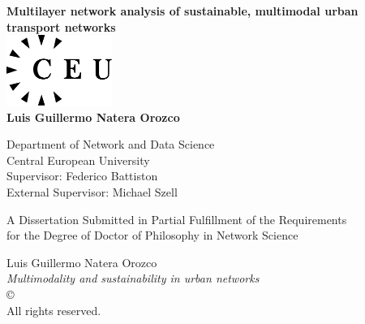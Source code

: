 \documentclass[a4paper,twoside,12pt]{book}
\begin{document}
\begin{titlepage}
	\begin{center}

		\textbf{\LARGE{Multilayer network analysis of sustainable, multimodal urban transport networks}}\\[3.3cm] %

		\includegraphics[width=3.45cm,height=2.3cm]{images/ceulogo.eps}\\[3.4cm]
		{\Large{\textbf{Luis Guillermo Natera Orozco}}}\\[0.4cm]

		\medskip

		Department of Network and Data Science \\
		Central European University\\ [1.2cm]

		Supervisor: Federico Battiston \\
		External Supervisor: Michael Szell

		\vfill

		A Dissertation Submitted in Partial Fulfillment of the Requirements\\ for the Degree of Doctor of Philosophy in Network Science\\[2cm]


		\vspace{1.0cm}
		\the\year
	\end{center}
\end{titlepage}

\newpage

\pagestyle{empty}

\mbox{}

\vfill

\noindent Luis Guillermo Natera Orozco\\
\emph{Multimodality and sustainability in urban networks}\\ 
\copyright \, \the\year 
\\ All rights reserved.
\end{document}
